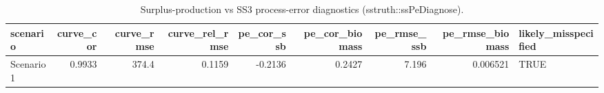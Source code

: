 
\begin{table}

\caption{\label{tab:external-sspe}Surplus-production vs SS3 process-error diagnostics (sstruth::ssPeDiagnose).}
\centering
\begin{tabular}[t]{lrrrrrrrl}
\toprule
scenario & curve\_cor & curve\_rmse & curve\_rel\_rmse & pe\_cor\_ssb & pe\_cor\_biomass & pe\_rmse\_ssb & pe\_rmse\_biomass & likely\_misspecified\\
\midrule
Scenario 1 & 0.9933 & 374.4 & 0.1159 & -0.2136 & 0.2427 & 7.196 & 0.006521 & TRUE\\
\bottomrule
\end{tabular}
\end{table}

